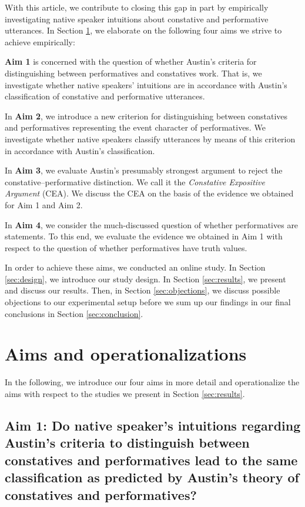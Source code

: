 \documentclass[egregdoesnotlikesansseriftitles,12pt]{scrartcl}
\begin{document}
With this article, we contribute to closing this gap in part by empirically investigating native speaker intuitions about constative and performative utterances. In Section \ref{sec:aims}, we elaborate on the following four aims we strive to achieve empirically:

\textbf{Aim 1} is concerned with the question of whether Austin's criteria for distinguishing between performatives and constatives work. That is, we investigate whether native speakers' intuitions are in accordance with Austin's classification of constative and performative utterances.

In \textbf{Aim 2}, we introduce a new criterion for distinguishing between constatives and performatives representing the event character of performatives. We investigate whether native speakers classify utterances by means of this criterion in accordance with Austin's classification.

In \textbf{Aim 3}, we evaluate Austin's presumably strongest argument to reject the constative--performative distinction. We call it the \textit{Constative Expositive Argument} (CEA). We discuss the CEA on the basis of the evidence we obtained for Aim 1 and Aim 2.

In \textbf{Aim 4}, we consider the much-discussed question of whether performatives are statements. To this end, we evaluate the evidence we obtained in Aim 1 with respect to the question of whether performatives have truth values.

In order to achieve these aims, we conducted an online study. In Section \ref{sec:design}, we introduce our study design. In Section \ref{sec:results}, we present and discuss our results. Then, in Section \ref{sec:objections}, we discuss possible objections to our experimental setup before we sum up our findings in our final conclusions in Section \ref{sec:conclusion}.


\section{Aims and operationalizations}\label{sec:aims}
In the following, we introduce our four aims in more detail and operationalize the aims with respect to the studies we present in Section \ref{sec:results}.


\subsection{Aim 1: Do native speaker's intuitions regarding Austin's criteria to distinguish between constatives and performatives lead to the same classification as predicted by Austin's theory of constatives and performatives?}
\end{document}
